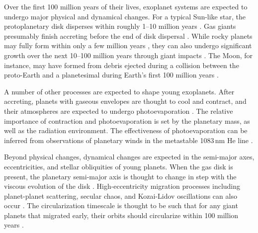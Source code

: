 \documentclass[12pt,twocolumn,tighten]{aastex63}
\begin{document}
Over the first 100 million years of their lives, exoplanet systems are
expected to undergo major physical and dynamical changes.  For a
typical Sun-like star, the protoplanetary disk disperses within
roughly 1--10 million years
\citep{mamajek_initial_2009,dullemond_inner_2010,williams_protoplanetary_2011}.
Gas giants presumably finish accreting before the end of disk
dispersal \citep{pollack_formation_1996}.  While rocky planets may
fully form within only a few million years
\citep{dauphas_hf-w-th_2011}, they can also undergo significant growth
over the next 10--100 million years through giant impacts \citep[{\it
e.g.},][]{kleine_hf-w_2009,konig_earths_2011,morbidelli_building_2012,raymond_terrestrial_2014}.
The Moon, for instance, may have formed from debris ejected during a
collision between the proto-Earth and a planetesimal during Earth's
first 100 million years \citep{cameron_origin_1976,canup_origin_2001}.

A number of other processes are expected to shape young exoplanets.
After accreting, planets with gaseous envelopes are thought to cool
and contract, and their atmospheres are expected to undergo
photoevaporation \citep[{\it
e.g.},][]{Fortney_et_al_2007,Owen_Wu_2013,Fulton_et_al_2017}.  The
relative importance of contraction and photoevaporation is set by the
planetary mass, as well as the radiation environment.  The
effectiveness of photoevaporation can be inferred from observations of
planetary winds in the metastable 1083$\,$nm He line
\citep{spake_helium_2018,oklopcic_new_2018,mansfield_detection_2018}.

Beyond physical changes, dynamical changes are expected in the
semi-major axes, eccentricities, and stellar obliquities of young
planets.  When the gas disk is present, the planetary semi-major axis
is thought to change in step with the viscous evolution of the disk
\citep{lin_orbital_1996}.  High-eccentricity migration processes
including planet-planet scattering, secular chaos, and Kozai-Lidov
oscillations can also occur \citep[{\it
e.g.},][]{chatterjee_dynamical_2008,lithwick_secular_2014,fabrycky_shrinking_2007}.
The circularization timescale is thought to be such that for any giant
planets that migrated early, their orbits should circularize within
100 million years \citep{zahn_tidal_1977}.
\end{document}
